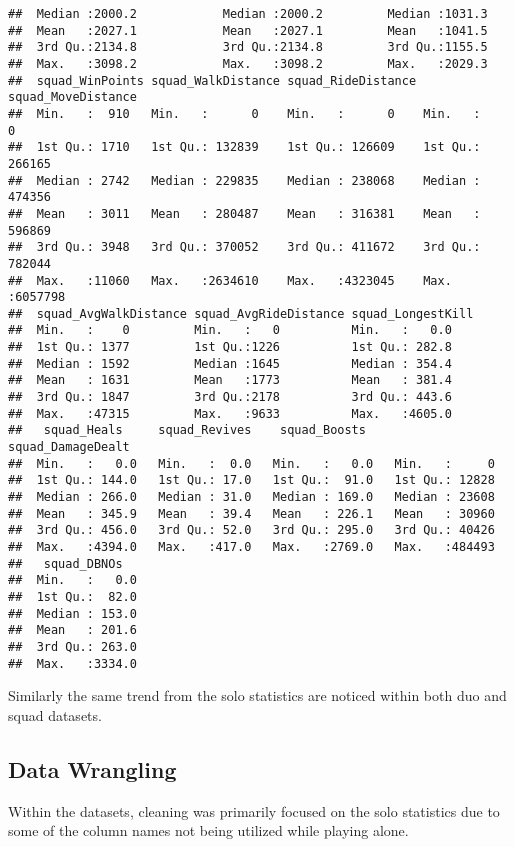 \documentclass[]{article}
\begin{document}
\begin{verbatim}
##  Median :2000.2            Median :2000.2         Median :1031.3       
##  Mean   :2027.1            Mean   :2027.1         Mean   :1041.5       
##  3rd Qu.:2134.8            3rd Qu.:2134.8         3rd Qu.:1155.5       
##  Max.   :3098.2            Max.   :3098.2         Max.   :2029.3       
##  squad_WinPoints squad_WalkDistance squad_RideDistance squad_MoveDistance
##  Min.   :  910   Min.   :      0    Min.   :      0    Min.   :      0   
##  1st Qu.: 1710   1st Qu.: 132839    1st Qu.: 126609    1st Qu.: 266165   
##  Median : 2742   Median : 229835    Median : 238068    Median : 474356   
##  Mean   : 3011   Mean   : 280487    Mean   : 316381    Mean   : 596869   
##  3rd Qu.: 3948   3rd Qu.: 370052    3rd Qu.: 411672    3rd Qu.: 782044   
##  Max.   :11060   Max.   :2634610    Max.   :4323045    Max.   :6057798   
##  squad_AvgWalkDistance squad_AvgRideDistance squad_LongestKill
##  Min.   :    0         Min.   :   0          Min.   :   0.0   
##  1st Qu.: 1377         1st Qu.:1226          1st Qu.: 282.8   
##  Median : 1592         Median :1645          Median : 354.4   
##  Mean   : 1631         Mean   :1773          Mean   : 381.4   
##  3rd Qu.: 1847         3rd Qu.:2178          3rd Qu.: 443.6   
##  Max.   :47315         Max.   :9633          Max.   :4605.0   
##   squad_Heals     squad_Revives    squad_Boosts    squad_DamageDealt
##  Min.   :   0.0   Min.   :  0.0   Min.   :   0.0   Min.   :     0   
##  1st Qu.: 144.0   1st Qu.: 17.0   1st Qu.:  91.0   1st Qu.: 12828   
##  Median : 266.0   Median : 31.0   Median : 169.0   Median : 23608   
##  Mean   : 345.9   Mean   : 39.4   Mean   : 226.1   Mean   : 30960   
##  3rd Qu.: 456.0   3rd Qu.: 52.0   3rd Qu.: 295.0   3rd Qu.: 40426   
##  Max.   :4394.0   Max.   :417.0   Max.   :2769.0   Max.   :484493   
##   squad_DBNOs    
##  Min.   :   0.0  
##  1st Qu.:  82.0  
##  Median : 153.0  
##  Mean   : 201.6  
##  3rd Qu.: 263.0  
##  Max.   :3334.0
\end{verbatim}

Similarly the same trend from the solo statistics are noticed within
both duo and squad datasets.

\subsection{Data Wrangling}\label{data-wrangling}

Within the datasets, cleaning was primarily focused on the solo
statistics due to some of the column names not being utilized while
playing alone.
\end{document}
